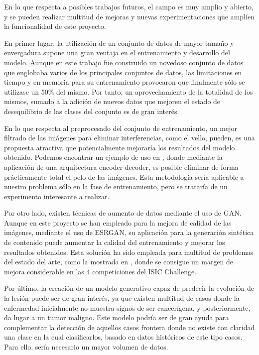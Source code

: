 En lo que respecta a posibles trabajos futuros, el campo es muy amplio y abierto, y se pueden realizar multitud de mejoras y nuevas experimentaciones que amplíen la funcionalidad de este proyecto.

En primer lugar, la utilización de un conjunto de datos de mayor tamaño y envergadura supone una gran ventaja en el entrenamiento y desarrollo del modelo. Aunque en este trabajo fue construido un novedoso conjunto de datos que englobaba varios de los principales conjuntos de datos, las limitaciones en tiempo y en memoria para su entrenamiento provocaron que finalmente sólo se utilizase un 50\% del mismo. Por tanto, un aprovechamiento de la totalidad de los mismos, sumado a la adición de nuevos datos que mejoren el estado de desequilibrio de las clases del conjunto es de gran interés.

En lo que respecta al preprocesado del conjunto de entrenamiento, un mejor filtrado de las imágenes para eliminar interferencias, como el vello,  pueden, es una propuesta atractiva que potencialmente mejoraría los resultados del modelo obtenido. Podemos encontrar un ejemplo de uso en \cite{9306830}, donde mediante la aplicación de una arquitectura encoder-decoder, es posible eliminar de forma prácticamente total el pelo de las imágenes. Esta metodología sería aplicable a nuestro problema sólo en la fase de entrenamiento, pero se trataría de un experimento interesante a realizar.

Por otro lado, existen técnicas de aumento de datos mediante el uso de GAN. Aunque en este proyecto se han empleado para la mejora de calidad de las imágenes, mediante el uso de ESRGAN, su aplicación para la generación sintética de contenido puede aumentar la calidad del entrenamiento y mejorar los resultados obtenidos.  Esta solución ha sido empleada para multitud de problemas del estado del arte, como la mostrada en \cite{ganskincancer}, donde se consigue un margen de mejora considerable en las 4 competiciones del ISIC Challenge.

Por último, la creación de un modelo generativo capaz de predecir la evolución de la lesión puede ser de gran interés, ya que existen multitud de casos donde la enfermedad inicialmente no muestra signos de ser cancerígena, y posteriormente, da lugar a un tumor maligno. Este modelo podría ser de gran ayuda para complementar la detección de aquellos casos frontera donde no existe con claridad una clase en la cual clasificarlos, basado en datos históricos de este tipo casos. Para ello, sería necesario un mayor volumen de datos.

